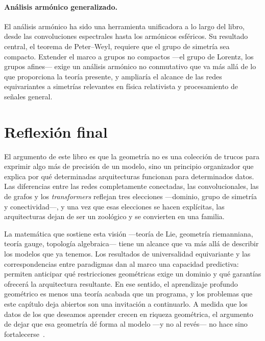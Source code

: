 \paragraph{An\'alisis arm\'onico generalizado.}
El an\'alisis arm\'onico ha sido una herramienta unificadora a lo largo del libro,
desde las convoluciones espectrales hasta los arm\'onicos esf\'ericos. Su
resultado central, el teorema de Peter--Weyl, requiere que el grupo de simetr\'ia
sea compacto. Extender el marco a grupos no compactos ---el grupo de Lorentz, los
grupos afines--- exige un an\'alisis arm\'onico no conmutativo que va m\'as all\'a
de lo que proporciona la teor\'ia presente, y ampliar\'ia el alcance de las redes
equivariantes a simetr\'ias relevantes en f\'isica relativista y procesamiento de
se\~nales general.

\section{Reflexi\'on final}
\label{sec:concl:reflection}

El argumento de este libro es que la geometr\'ia no es una colecci\'on de trucos
para exprimir algo m\'as de precisi\'on de un modelo, sino un principio
organizador que explica por qu\'e determinadas arquitecturas funcionan para
determinados datos. Las diferencias entre las redes completamente conectadas, las
convolucionales, las de grafos y los \emph{transformers} reflejan tres elecciones
---dominio, grupo de simetr\'ia y conectividad---, y una vez que esas elecciones
se hacen expl\'icitas, las arquitecturas dejan de ser un zool\'ogico y se
convierten en una familia.

La matem\'atica que sostiene esta visi\'on ---teor\'ia de Lie, geometr\'ia
riemanniana, teor\'ia gauge, topolog\'ia algebraica--- tiene un alcance que va
m\'as all\'a de describir los modelos que ya tenemos. Los resultados de
universalidad equivariante y las correspondencias entre paradigmas dan al marco
una capacidad predictiva: permiten anticipar qu\'e restricciones geom\'etricas
exige un dominio y qu\'e garant\'ias ofrecer\'a la arquitectura resultante. En
ese sentido, el aprendizaje profundo geom\'etrico es menos una teor\'ia acabada
que un programa, y los problemas que este cap\'itulo deja abiertos son una
invitaci\'on a continuarlo. A medida que los datos de los que deseamos aprender
crecen en riqueza geom\'etrica, el argumento de dejar que esa geometr\'ia d\'e
forma al modelo ---y no al rev\'es--- no hace sino fortalecerse~\citep{bronstein2021geometric}.

